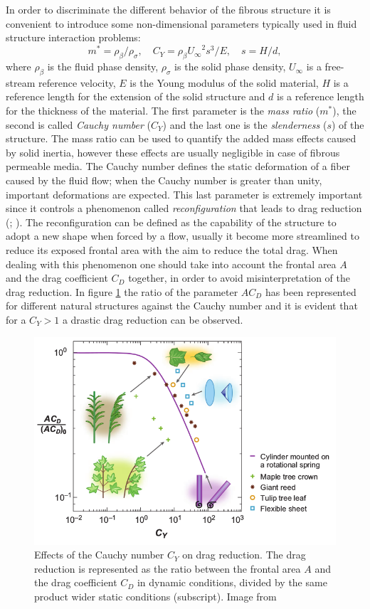 In order to discriminate the different behavior of the fibrous structure it is convenient to introduce some non-dimensional parameters typically used in fluid structure interaction problems:
$$ m^* = \rho_{\beta} / \rho_{\sigma}, \quad C_Y= \rho_{\beta} {U_{\infty}}^2 s^3 / E, \quad s = H/d, $$
where $\rho_{\beta}$ is the fluid phase density, $\rho_{\sigma}$ is the solid phase density, $U_{\infty}$ is a free-stream reference velocity, $E$ is the Young modulus of the solid material, $H$ is a reference length for the extension of the solid structure and $d$ is a reference length for the thickness of the material.
The first parameter is the \textit{mass ratio} ($m^*$), the second is called \textit{Cauchy number} ($C_Y$) and the last one is the \textit{slenderness} ($s$) of the structure.
The mass ratio can be used to quantify the added mass effects caused by solid inertia, however these effects are usually negligible in case of fibrous permeable media.
The Cauchy number defines the static deformation of a fiber caused by the fluid flow; when the Cauchy number is greater than unity, important deformations are expected.
This last parameter is extremely important since it controls a phenomenon called \textit{reconfiguration} that leads to drag reduction (\citet{gosselin2011drag};  \citet{alvarado2017nature}).
The reconfiguration can be defined as the capability of the structure to adopt a new shape when forced by a flow, usually it become more streamlined to reduce its exposed frontal area with the aim to reduce the total drag.
When dealing with this phenomenon one should take into account the frontal area $A$ and the drag coefficient $C_D$ together, in order to avoid misinterpretation of the drag reduction. In figure \ref{fig:cycd} the ratio of the parameter $AC_D$ has been represented for different natural structures against the Cauchy number and it is evident that for a $C_Y>1$ a drastic drag reduction can be observed.

\begin{figure}[t]
	\centering
	\includegraphics[width=0.7\linewidth]{chapter_1/cy_cd}
	\caption{Effects of the Cauchy number $C_Y$ on drag reduction. The drag reduction is represented as the ratio between the frontal area $A$ and the drag coefficient $C_D$ in dynamic conditions, divided by the same product wider static conditions (subscript). Image from \citet{de2008effects}}
	\label{fig:cycd}
\end{figure}

